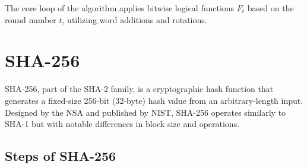 \documentclass{article}
\begin{document}
The core loop of the algorithm applies bitwise logical functions $F_t$ based on the round number $t$, utilizing word additions and rotations.

\section{SHA-256}

SHA-256, part of the SHA-2 family, is a cryptographic hash function that generates a fixed-size 256-bit (32-byte) hash value from an arbitrary-length input. Designed by the NSA and published by NIST, SHA-256 operates similarly to SHA-1 but with notable differences in block size and operations.

\subsection{Steps of SHA-256}
\end{document}
